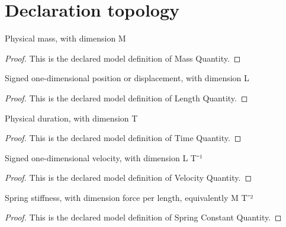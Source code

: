 \section{Declaration topology}
\begin{definition}
  \label{def:physics:phyx-mini-0280:phyxminiproblems-problemphyxmini0280-massquantity}
  Physical mass, with dimension M
\end{definition}
\begin{proof}
  This is the declared model definition of Mass Quantity.
\end{proof}
\begin{definition}
  \label{def:physics:phyx-mini-0280:phyxminiproblems-problemphyxmini0280-lengthquantity}
  Signed one-dimensional position or displacement, with dimension L
\end{definition}
\begin{proof}
  This is the declared model definition of Length Quantity.
\end{proof}
\begin{definition}
  \label{def:physics:phyx-mini-0280:phyxminiproblems-problemphyxmini0280-timequantity}
  Physical duration, with dimension T
\end{definition}
\begin{proof}
  This is the declared model definition of Time Quantity.
\end{proof}
\begin{definition}
  \label{def:physics:phyx-mini-0280:phyxminiproblems-problemphyxmini0280-velocityquantity}
  Signed one-dimensional velocity, with dimension L T⁻¹
\end{definition}
\begin{proof}
  This is the declared model definition of Velocity Quantity.
\end{proof}
\begin{definition}
  \label{def:physics:phyx-mini-0280:phyxminiproblems-problemphyxmini0280-springconstantquantity}
  Spring stiffness, with dimension force per length, equivalently M T⁻²
\end{definition}
\begin{proof}
  This is the declared model definition of Spring Constant Quantity.
\end{proof}
